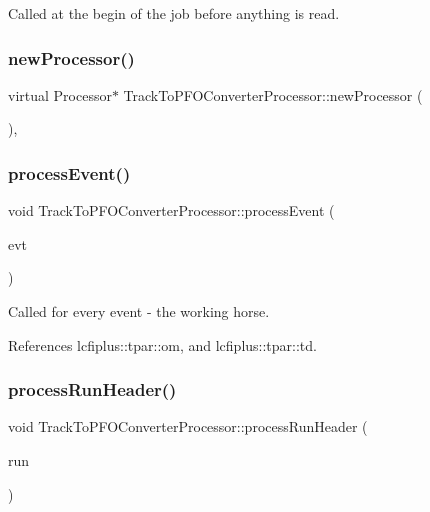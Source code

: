 Called at the begin of the job before anything is read. 

\mbox{\label{classTrackToPFOConverterProcessor_aa5473c5b5fa8973d69746bcb33da4701}} 
\subsubsection{new\+Processor()}
{\footnotesize\ttfamily virtual Processor$\ast$ Track\+To\+P\+F\+O\+Converter\+Processor\+::new\+Processor (\begin{DoxyParamCaption}{ }\end{DoxyParamCaption})\hspace{0.3cm}{\ttfamily [inline]}, {\ttfamily [virtual]}}

\mbox{\label{classTrackToPFOConverterProcessor_a7d69d8417c63a4dd093381484b0b7a70}} 
\subsubsection{process\+Event()}
{\footnotesize\ttfamily void Track\+To\+P\+F\+O\+Converter\+Processor\+::process\+Event (\begin{DoxyParamCaption}\item[{L\+C\+Event $\ast$}]{evt }\end{DoxyParamCaption})\hspace{0.3cm}{\ttfamily [virtual]}}



Called for every event -\/ the working horse. 



References lcfiplus\+::tpar\+::om, and lcfiplus\+::tpar\+::td.

\mbox{\label{classTrackToPFOConverterProcessor_aacebef63027292a5861d6a119a488775}} 
\subsubsection{process\+Run\+Header()}
{\footnotesize\ttfamily void Track\+To\+P\+F\+O\+Converter\+Processor\+::process\+Run\+Header (\begin{DoxyParamCaption}\item[{L\+C\+Run\+Header $\ast$}]{run }\end{DoxyParamCaption})\hspace{0.3cm}{\ttfamily [virtual]}}



